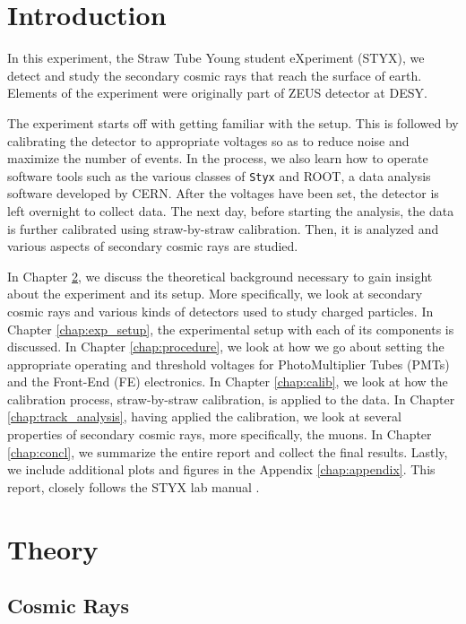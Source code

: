 \documentclass[a4paper]{report}
\numberwithin{equation}{section}
\begin{document}
\tableofcontents

\chapter{Introduction} \label{chap:intro}

In this experiment, the Straw Tube Young student eXperiment (STYX), we detect and study the secondary cosmic rays that reach the surface of earth. Elements of the experiment were originally part of ZEUS detector at DESY. 

The experiment starts off with getting familiar with the setup. This is followed by calibrating the detector to appropriate voltages so as to reduce noise and maximize the number of events. In the process, we also learn how to operate software tools such as the various classes of \texttt{Styx} and ROOT, a data analysis software developed by CERN. After the voltages have been set, the detector is left overnight to collect data. The next day, before starting the analysis, the data is further calibrated using straw-by-straw calibration. Then, it is analyzed and various aspects of secondary cosmic rays are studied. 

In Chapter \ref{chap:theory}, we discuss the theoretical background necessary to gain insight about the experiment and its setup. More specifically, we look at secondary cosmic rays and various kinds of detectors used to study charged particles. In Chapter \ref{chap:exp_setup}, the experimental setup with each of its components is discussed. In Chapter \ref{chap:procedure}, we look at how we go about setting the appropriate operating and threshold voltages for PhotoMultiplier Tubes (PMTs) and the Front-End (FE) electronics. In Chapter \ref{chap:calib}, we look at how the calibration process, straw-by-straw calibration, is applied to the data. In Chapter \ref{chap:track_analysis}, having applied the calibration, we look at several properties of secondary cosmic rays, more specifically, the muons. In Chapter \ref{chap:concl}, we summarize the entire report and collect the final results. Lastly, we include additional plots and figures in the Appendix \ref{chap:appendix}. This report, closely follows the STYX lab manual \cite{labman}.

\chapter{Theory} \label{chap:theory}

\section{Cosmic Rays}
\end{document}
